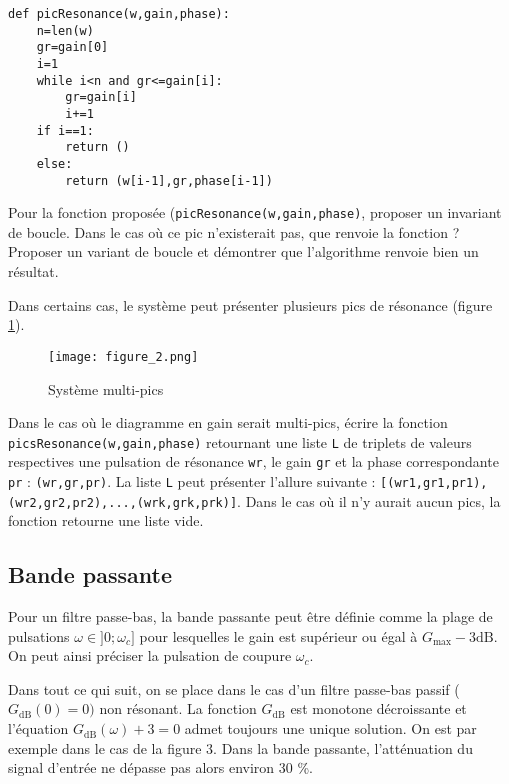\begin{lstlisting}
def picResonance(w,gain,phase):
    n=len(w)
    gr=gain[0]
    i=1
    while i<n and gr<=gain[i]:
        gr=gain[i]
        i+=1
    if i==1:
        return ()
    else:
        return (w[i-1],gr,phase[i-1])
\end{lstlisting}


 
\question{} Pour la fonction proposée (\texttt{picResonance(w,gain,phase)}, proposer un invariant de boucle. Dans le cas où ce pic n'existerait pas, que renvoie la fonction ? Proposer un variant de boucle et démontrer que l'algorithme renvoie bien un résultat.
 



Dans certains cas, le système peut présenter plusieurs pics de résonance (figure \ref{Fig2}).

\begin{figure}[!h]
\begin{center}
\texttt{[image: figure\_2.png]} 
\caption{\label{Fig2} Système multi-pics}
\end{center}
\end{figure}

 
\question{} Dans le cas où le diagramme en gain serait multi-pics, écrire la fonction \\ \texttt{picsResonance(w,gain,phase)} retournant une liste \texttt{L} de triplets de valeurs respectives une pulsation de résonance \texttt{wr}, le gain \texttt{gr} et la phase correspondante \texttt{pr} : \texttt{(wr,gr,pr)}. La liste \texttt{L} peut présenter l'allure suivante : \texttt{[(wr1,gr1,pr1),(wr2,gr2,pr2),...,(wrk,grk,prk)]}. Dans le cas où il n'y aurait aucun pics, la fonction retourne une liste vide.
 


\subsection*{Bande passante}

\begin{dBox}
Pour un filtre passe-bas, la bande passante peut être définie comme la plage de pulsations $\omega \in ]0;\omega_c]$ pour lesquelles le gain est supérieur ou égal à $G_{\text{max}}-3 \text{dB}$. On peut ainsi préciser la pulsation de coupure $\omega_c$.
\end{dBox}



Dans tout ce qui suit, on se place dans le cas d'un filtre passe-bas passif ($G_{\text{dB}}(0) = 0)$ non résonant. La fonction $G_{\text{dB}}$ est monotone décroissante et l'équation $G_\text{dB}(\omega) + 3 = 0$ admet toujours une unique solution. On est par exemple dans le cas de la figure 3. Dans la bande passante, l'atténuation du signal d'entrée ne dépasse pas alors environ 30 \%.


